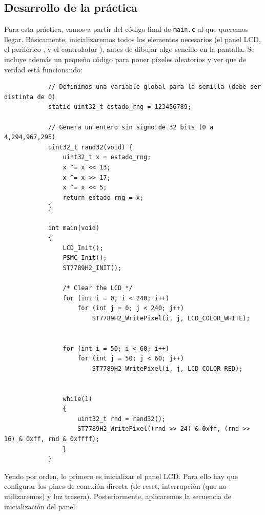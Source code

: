 \documentclass[../main.tex]{subfiles}
\begin{document}
    \subsection{Desarrollo de la práctica}

        Para esta práctica, vamos a partir del código final de \texttt{main.c} al que queremos llegar. Básicamente, inicializaremos todos los elementos necesarios (el panel LCD, el periférico , y el controlador \LCDMAN[]), antes de dibujar algo sencillo en la pantalla. Se incluye además un pequeño código para poner píxeles aleatorios y ver que de verdad está funcionando:

        \begin{lstlisting}
            // Definimos una variable global para la semilla (debe ser distinta de 0)
            static uint32_t estado_rng = 123456789;

            // Genera un entero sin signo de 32 bits (0 a 4,294,967,295)
            uint32_t rand32(void) {
                uint32_t x = estado_rng;
                x ^= x << 13;
                x ^= x >> 17;
                x ^= x << 5;
                return estado_rng = x;
            }

            int main(void)
            {
                LCD_Init();
                FSMC_Init();
                ST7789H2_INIT();

                /* Clear the LCD */
                for (int i = 0; i < 240; i++)
                    for (int j = 0; j < 240; j++)
                        ST7789H2_WritePixel(i, j, LCD_COLOR_WHITE);


                for (int i = 50; i < 60; i++)
                    for (int j = 50; j < 60; j++)
                        ST7789H2_WritePixel(i, j, LCD_COLOR_RED);


                while(1)
                {
                    uint32_t rnd = rand32();
                    ST7789H2_WritePixel((rnd >> 24) & 0xff, (rnd >> 16) & 0xff, rnd & 0xffff);
                }
            }
        \end{lstlisting}

        Yendo por orden, lo primero es inicializar el panel LCD. Para ello hay que configurar los pines de conexión directa (de reset, interrupción (que no utilizaremos) y luz trasera). Posteriormente, aplicaremos la secuencia de inicialización del panel.
\end{document}
